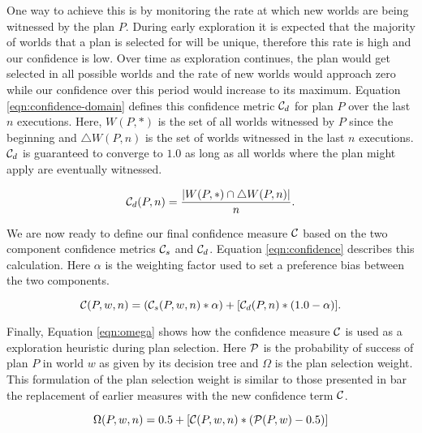 One way to achieve this is by monitoring the rate at which new worlds are being witnessed by the plan $P$. During early exploration it is expected that the majority of worlds that a plan is selected for will be unique, therefore this rate is high and our confidence is low. Over time as exploration continues, the plan would get selected in all possible worlds and the rate of new worlds would approach zero while our confidence over this period would increase to its maximum.  Equation \ref{eqn:confidence-domain} defines this confidence metric $\C_d$ for plan $P$ over the last $n$ executions. Here, $W(P,*)$ is the set of all worlds witnessed by $P$ since the beginning and $\triangle W(P,n)$ is the set of worlds witnessed in the last $n$ executions. $\C_d$ is guaranteed to converge to $1.0$ as long as all worlds where the plan might apply are eventually witnessed.

\begin{equation}
\C_d(P,n) = \frac{|W(P,*)\cap \triangle W(P,n) |}{n}.
\label{eqn:confidence-domain}
\end{equation}

We are now ready to define our final confidence measure $\C$ based on the two component confidence metrics $\C_s$ and $\C_d$. Equation \ref{eqn:confidence} describes this calculation. Here $\alpha$ is the weighting factor used to set a preference bias between the two components.

\begin{equation}
\C(P,w,n) = (\C_s(P,w,n)*\alpha) + [\C_d(P,n)*(1.0-\alpha)].
\label{eqn:confidence}
\end{equation}

Finally, Equation \ref{eqn:omega} shows how the confidence measure $\C$ is used as a exploration heuristic during plan selection. Here $\P$ is the probability of success of plan $P$ in world $w$ as given by its decision tree and $\Omega$ is the plan selection weight. This formulation of the plan selection weight is similar to those presented in \cite{singh10:extending, singh10:learning} bar the replacement of earlier measures with the new confidence term $\C$.

\begin{equation}
\Omega(P,w,n) = 0.5 + \left[  \C(P,w,n) *  \left( \P(P,w) - 0.5 \right)  \right]
\label{eqn:omega}   
\end{equation}

